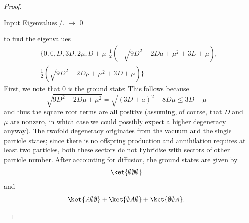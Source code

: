 \begin{proof}
\begin{parts}
\begin{mmaCell}{Input}
	Eigenvalues[/.\mmaUnd{\(\pmb{\lambda}\)} \(\to\) 0]
\end{mmaCell}
to find the eigenvalues
\begin{align*}
&\{0,0,D,3 D,2 \mu ,D+\mu ,\frac{1}{2} \left(-\sqrt{9 D^2-2 D \mu +\mu ^2}+3 D+\mu \right),\\
&\frac{1}{2} \left(\sqrt{9 D^2-2 D \mu +\mu ^2}+3 D+\mu \right)\}
\end{align*}
First, we note that $0$ is the ground state: This follows because
\[
	\sqrt{9D^2 - 2D\mu + \mu^2} = \sqrt{(3D+\mu)^2 - 8D\mu} \le 3D+\mu
\]
and thus the square root terms are all positive (assuming, of course, that $D$ and $\mu$ are nonzero, in which case we could possibly expect a higher degeneracy anyway). The twofold degeneracy originates from the vacuum and the single particle states; since there is no offspring production and annihilation requires at least two particles, both these sectors do not hybridise with sectors of other particle number. After accounting for diffusion, the ground states are given by
\[
	\ket{\emptyset\emptyset\emptyset}
\] 
and
\[
	\ket{A\emptyset\emptyset}+\ket{\emptyset A\emptyset}+\ket{\emptyset\emptyset A}
.\qedhere\] 
	\end{parts}
\end{proof}
